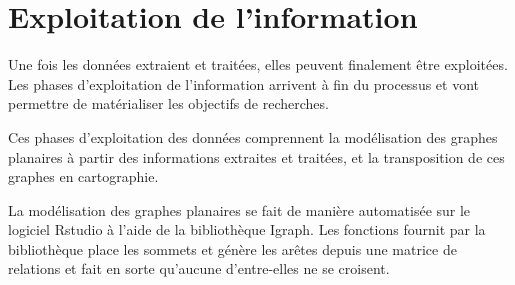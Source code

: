 \section{Exploitation de l'information}
Une fois les données extraient et traitées, elles peuvent finalement être exploitées.
Les phases d'exploitation de l'information  arrivent à fin du processus et vont permettre de matérialiser les objectifs de recherches.

Ces phases d'exploitation des données comprennent la modélisation des graphes planaires à partir des informations extraites et traitées, et la transposition de ces graphes en cartographie.

La modélisation des graphes planaires se fait de manière automatisée sur le logiciel Rstudio à l'aide de la bibliothèque Igraph. Les fonctions fournit par la bibliothèque place les sommets et génère les arêtes depuis une matrice de relations et fait en sorte qu'aucune d'entre-elles ne se croisent. 


